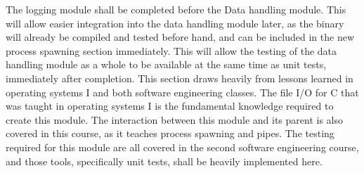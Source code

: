 \documentclass[onecolumn, draftclsnofoot,10pt, compsoc]{IEEEtran}
\begin{document}
The logging module shall be completed before the Data handling module. This will allow easier integration into the data handling module later, as the binary will already be compiled and tested before hand, and can be included in the new process spawning section immediately. This will allow the testing of the data handling module as a whole to be available at the same time as unit tests, immediately after completion. This section draws heavily from lessons learned in operating systems I and both software engineering classes. The file I/O for C that was taught in operating systems I is the fundamental knowledge required to create this module. The interaction between this module and its parent is also covered in this course, as it teaches process spawning and pipes. The testing required for this module are all covered in the second software engineering course, and those tools, specifically unit tests, shall be heavily implemented here.  
\end{document}

